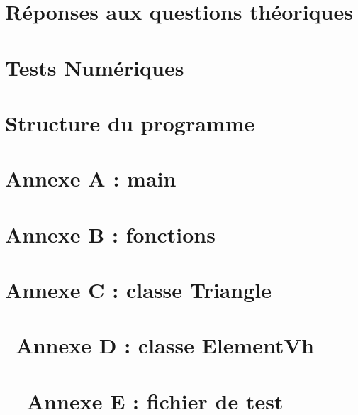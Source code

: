 \documentclass[11pt, a4paper]{report}
\begin{document}

\tableofcontents

\newpage

\chapter{Réponses aux questions théoriques}



\newpage



\newpage



\newpage

\chapter{Tests Numériques}



\newpage

\chapter{Structure du programme}



\newpage

\chapter{Annexe A : main}



\newpage

\chapter{Annexe B : fonctions}



\newpage

\chapter{Annexe C : classe Triangle}



\newpage

\chapter{\, Annexe D : classe ElementVh}



\chapter{\, \, Annexe E : fichier de test}


\end{document}
